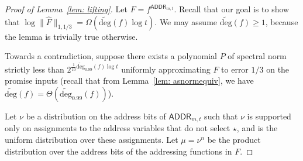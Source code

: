 \documentclass[10pt,a4paper]{article}
\theoremstyle{definition}
\newcommand{\adeg}{\widetilde{\mathrm{deg}}}
\newcommand{\asnorm}[2]{\|\widehat{#1}\|_{1,#2}}
\newcommand{\ADD}{\mathsf{ADDR}}
\begin{document}
\begin{proof}[Proof of Lemma~\ref{lem: lifting}]

Let $F = f^{\ADD_{m, t}}$. Recall that our goal is to show that $\log \asnorm{F}{1/3} = \Omega(\adeg(f) \log t)$. We may assume $\adeg(f) \geq 1$, because the lemma is trivially true otherwise.  

Towards a contradiction, suppose there exists a polynomial $P$ of spectral norm strictly less than $2^{\frac{1}{10}\adeg_{0.99}(f)\log t}$ uniformly approximating $F$ to error $1/3$ on the promise inputs (recall that from Lemma~\ref{lem: asnormequiv}, we have $\adeg(f) = \Theta(\adeg_{0.99}(f))$).

Let $\nu$ be a distribution on the address bits of $\ADD_{m, t}$ such that $\nu$ is supported only on assignments to the address variables that do not select $\star$, and is the uniform distribution over these assignments.
Let $\mu = \nu^n$ be the product distribution over the address bits of the addressing functions in $F$.


\end{proof}
\end{document}
